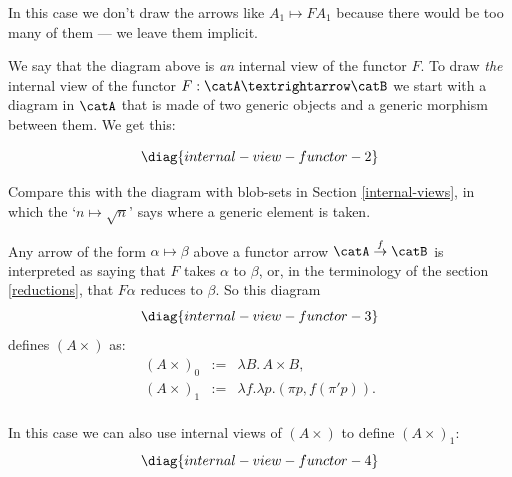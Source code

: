 \documentclass[oneside,12pt]{article}
\begin{document}
In this case we don't draw the arrows like $A_1 \mapsto FA_1$ because
there would be too many of them --- we leave them implicit.

We say that the diagram above is {\sl an} internal view of the functor
$F$. To draw {\sl the} internal view of the functor $F: \catA → \catB$
we start with a diagram in $\catA$ that is made of two generic objects
and a generic morphism between them. We get this:

$$\pu
  \diag{internal-view-functor-2}
$$

Compare this with the diagram with blob-sets in Section
\ref{internal-views}, in which the `$n \mapsto \sqrt{n}$' says where a
generic element is taken.

Any arrow of the form $α \mapsto β$ above a functor arrow $\catA
\ton{f} \catB$ is interpreted as saying that $F$ takes $α$ to $β$, or,
in the terminology of the section \ref{reductions}, that $Fα$ reduces
to $β$. So this diagram 
%
$$\pu
  \diag{internal-view-functor-3}
$$
%
defines $(A×)$ as:
%
$$\begin{array}{rcl}
  (A×)_0 &:=& λB.\,A×B,\\
  (A×)_1 &:=& λf.λp.(πp,f(π'p)).\\
  \end{array}
$$

In this case we can also use internal views of $(A×)$ to define
$(A×)_1$:
%
$$\pu
  \diag{internal-view-functor-4}
$$
\end{document}
